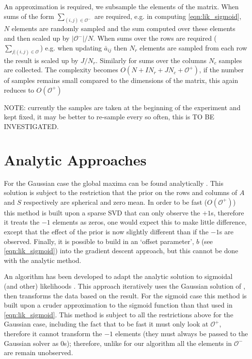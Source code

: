 \documentclass{article}
\newcommand{\abar}{\bar{a}}
\begin{document}
An approximation is required, we subsample the elements of the matrix. When sums of the form $\sum_{(i,j)\in\mathcal{O}^-}$ are required, 
e.g. in computing \eqref{eqn:lik_sigmoid}, $N$ elements are randomly sampled and the sum computed
over these elements and then scaled up by $|\mathcal{O}^-|/N$.
When sums over the rows are required ($\sum_{j|(i,j)\in\mathcal{O}}$) e.g. when updating $\abar_{ij}$ then $N_r$ elements are sampled from each row the result is scaled up by $J/N_r$. Similarly for sums over the columns $N_c$ samples are collected. 
The complexity becomes $O(N + IN_r + JN_c + \mathcal{O}^+)$, if the number of samples remains small compared to the dimensions of the matrix, this again reduces to $O(\mathcal{O}^+)$

NOTE: currently the samples are taken at the beginning of the experiment and kept fixed, it may be better to re-sample every so often, this is TO BE INVESTIGATED.

\section{Analytic Approaches}
For the Gaussian case the global maxima can be found analytically \citep{nakajima2010}. 
This solution is subject to the restriction that the prior on the rows and columns of $A$ and $S$
respectively are spherical and zero mean. In order to be fast ($O(\mathcal{O}^+)$) this method is built upon a sparse SVD that can only observe the $+1$s, therefore it treats the $-1$ elements as zeros, one would expect this to make little difference, except that the effect of the prior is now slightly different than if the $-1$s are observed. 
Finally, it is possible to build in an `offset parameter', $b$ (see \eqref{eqn:lik_sigmoid}) into the gradient descent approach, but this cannot be done with the analytic method.

An algorithm has been developed to adapt the analytic solution to sigmoidal (and other) likelihoods \citep{seeger2012}.
This approach iteratively uses the Gaussian solution of \citep{nakajima2010}, then 
transforms the data based on the result. For the sigmoid case this method is built upon a
cruder approximation to the sigmoid function than that used in \eqref{eqn:lik_sigmoid}.
This method is subject to all the restrictions above for the Gaussian case, 
including the fact that to be fast it must only look at $\mathcal{O}^+$, therefore it cannot 
transform the $-1$ elements (they must always be passed to the Gaussian solver as $0$s);
therefore, unlike for our algorithm all the elements in $\mathcal{O}^-$ are remain unobserved.
\end{document}
